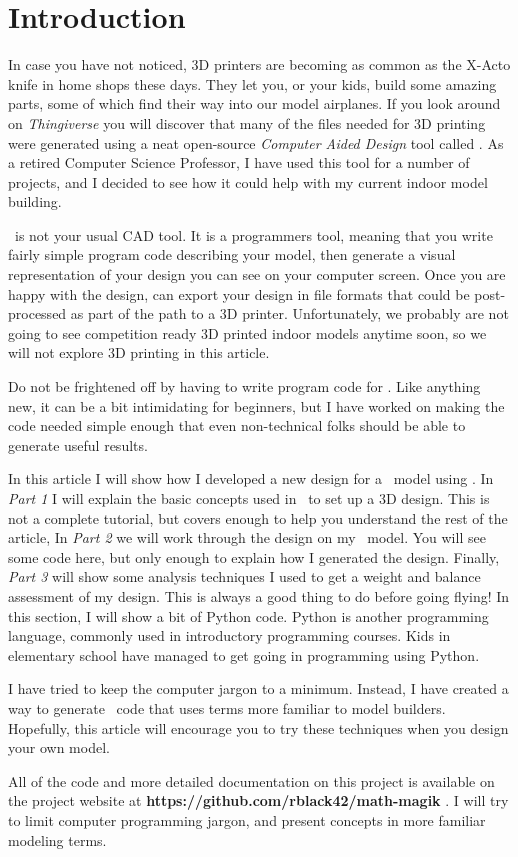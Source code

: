 \section{Introduction}

In case you have not noticed, 3D printers are becoming as common as the X-Acto
knife in home shops these days. They let you, or your kids, build some amazing
parts, some of which find their way into our model airplanes. If you look
around on {\it Thingiverse} \cite{thingy} you will discover that many of the
files needed for 3D printing were generated using a neat open-source {\it
Computer Aided Design} tool called \osc. As a retired Computer
Science Professor, I have used this tool for a number of projects, and I
decided to see how it could help with my current indoor model building.

\osc\ is not your usual CAD tool. It is a programmers tool, meaning that you
write fairly simple program code describing your model, then generate a visual
representation of your design you can see on your computer screen. Once you are
happy with the design, \osc can export your design in file formats that could
be post-processed as part of the path to a 3D printer. Unfortunately, we
probably are not going to see competition ready 3D printed indoor models
anytime soon, so we will not explore 3D printing in this article.

Do not be frightened off by having to write program code for \osc. Like
anything new, it can be a bit intimidating for beginners, but I have worked on
making the code needed simple enough that even non-technical folks should be
able to generate useful results.

In this article I will show how I developed a new design for a \LPP\ model
using \osc. In {\it Part 1} I will explain the basic concepts used in \osc\ to
set up a 3D design. This is not a complete tutorial, but covers enough to help
you understand the rest of the article, In {\it Part 2} we will work through
the design on my \LPP\ model. You will see some code here, but only enough to
explain how I generated the design. Finally, {\it Part 3} will show some
analysis techniques I used to get a weight and balance assessment of my design.
This is always a good thing to do before going flying! In this section, I will
show a bit of Python code. Python is another programming language, commonly
used in introductory programming courses. Kids in elementary school have
managed to get going in programming using Python.

I have tried to keep the computer jargon to a minimum. Instead, I have created
a way to generate \osc\ code that uses terms more familiar to model builders.
Hopefully, this article will encourage you to try these techniques when you
design your own model.

All of the code and more detailed documentation on this project is available on
the project website at {\bf https://github.com/rblack42/math-magik}
\cite{blackr}. I will try to limit computer programming jargon, and present
concepts in more familiar modeling terms.




